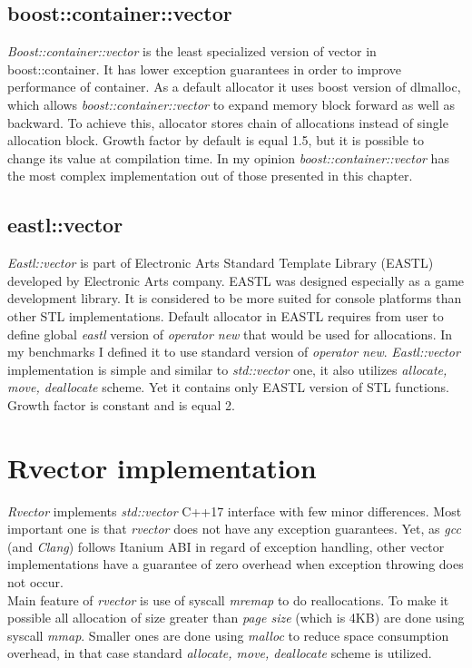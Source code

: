\documentclass[inz, english, shortabstract]{iithesis}
\begin{document}
\section{boost::container::vector}
{\it Boost::container::vector}\cite{boost::container::vector_impl} is the least specialized version of vector in {boost::container}. It has lower exception guarantees in order to improve performance of container\cite{boost_exceptions}. As a default allocator it uses boost version of dlmalloc\cite{dlmalloc}, which allows {\it boost::container::vector} to expand memory block forward as well as backward. To achieve this, allocator stores chain of allocations instead of single allocation block. Growth factor by default is equal 1.5, but it is possible to change its value at compilation time. In my opinion {\it boost::container::vector} has the most complex implementation out of those presented in this chapter.

\section{eastl::vector}
{\it Eastl::vector}\cite{eastl::vector_impl} is part of Electronic Arts Standard Template Library (EASTL) developed by Electronic Arts company. EASTL was designed especially as a game development library. It is considered to be more suited for console platforms\cite{eastl_faq} than other STL implementations. Default allocator in EASTL requires from user to define global {\it eastl} version of {\it operator new} that would be used for allocations. In my benchmarks I defined it to use standard version of {\it operator new}. {\it Eastl::vector} implementation is simple and similar to {\it std::vector} one, it also utilizes {\it allocate, move, deallocate} scheme. Yet it contains only EASTL version of STL functions. Growth factor is constant and is equal 2.  


\chapter{Rvector implementation}
{\it Rvector}\cite{rvector_impl} implements {\it std::vector} C++17 interface with few minor differences. Most important one is that {\it rvector} does not have any exception guarantees. Yet, as {\it gcc} (and {\it Clang}) follows Itanium ABI\cite{Itanium_ABI} in regard of exception handling, other vector implementations have a guarantee of zero overhead when exception throwing does not occur. \\
Main feature of {\it rvector} is use of syscall {\it mremap} to do reallocations. To make it possible all allocation of size greater than {\it page size} (which is 4KB) are done using syscall {\it mmap}. Smaller ones are done using {\it malloc} to reduce space consumption overhead, in that case standard {\it allocate, move, deallocate} scheme is utilized.
\end{document}
